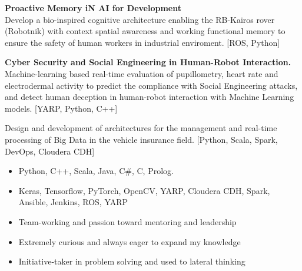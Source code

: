 \documentclass[10pt,a4paper,ragged2e]{altacv}
\begin{document}


\begin{fullwidth}
  \makecvheader
\end{fullwidth}



\textbf{Proactive Memory iN AI for Development}\\
Develop a bio-inspired cognitive architecture enabling the RB-Kairos rover (Robotnik) with context spatial awareness and working functional memory to ensure the safety of human workers in industrial enviroment. [ROS, Python]

\divider

\textbf{Cyber Security and Social Engineering in Human-Robot Interaction.}\\
Machine-learning based real-time evaluation of pupillometry, heart rate and electrodermal activity to predict the compliance with Social Engineering attacks, and detect human deception in human-robot interaction with Machine Learning models. [YARP, Python, C++]

\divider

Design and development of architectures for the management and real-time processing of Big Data in the vehicle insurance field. [Python, Scala, Spark, DevOps, Cloudera CDH]


\smallskip
\begin{itemize}
  \item Python, C++, Scala, Java, C\#, C, Prolog.
        \smallskip
  \item Keras, Tensorflow, PyTorch, OpenCV, YARP, Cloudera CDH, Spark, Ansible, Jenkins, ROS, YARP
        \smallskip
\end{itemize}
\smallskip
\begin{itemize}
  \item Team-working and passion toward mentoring and leadership
        \smallskip
  \item Extremely curious and always eager to expand my knowledge
        \smallskip
  \item Initiative-taker in problem solving and used to lateral thinking
\end{itemize}
\end{document}
